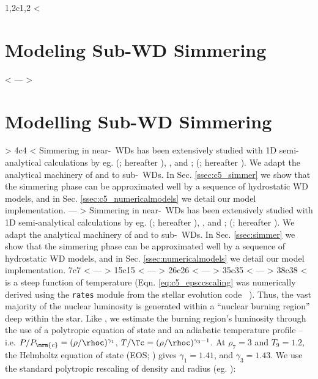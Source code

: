 1,2c1,2
< \section{Modeling Sub-\Mch WD Simmering}
< \label{sec:c5_modelsim}
---
> \section{Modelling Sub-\Mch WD Simmering}
> \label{sec:modelsim}
4c4
< Simmering in near-\Mch\ WDs has been extensively studied with 1D semi-analytical calculations by eg. \citeauthor{wooswk04} (\citeyear{wooswk04}; hereafter \citeal{wooswk04}), \cite{lesa+06, piro08}, and \citeauthor{piroc08}; (\citeyear{piroc08}; hereafter \citeal{piroc08}).  We adapt the analytical machinery of \citeal{wooswk04} and \citeal{piroc08} to sub-\Mch\ WDs.  In Sec. \ref{ssec:c5_simmer} we show that the simmering phase can be approximated well by a sequence of hydrostatic WD models, and in Sec. \ref{ssec:c5_numericalmodels} we detail our model implementation.
---
> Simmering in near-\Mch\ WDs has been extensively studied with 1D semi-analytical calculations by eg. \citeauthor{wooswk04} (\citeyear{wooswk04}; hereafter \citeal{wooswk04}), \cite{lesa+06, piro08}, and \citeauthor{piroc08}; (\citeyear{piroc08}; hereafter \citeal{piroc08}).  We adapt the analytical machinery of \citeal{wooswk04} and \citeal{piroc08} to sub-\Mch\ WDs.  In Sec. \ref{ssec:simmer} we show that the simmering phase can be approximated well by a sequence of hydrostatic WD models, and in Sec. \ref{ssec:numericalmodels} we detail our model implementation.
7c7
< \label{ssec:c5_simmer}
---
> \label{ssec:simmer}
15c15
< \label{eq:c5_taucc}
---
> \label{eq:taucc}
26c26
< \label{eq:c5_convlum}
---
> \label{eq:convlum}
35c35
< \label{eq:c5_epsccscaling}
---
> \label{eq:epsccscaling}
38c38
< \noindent is a steep function of temperature (Eqn. \ref{eq:c5_epsccscaling} was numerically derived using the \texttt{rates} module from the stellar evolution code \mesa\ \citep{paxt+11}).  Thus, the vast majority of the nuclear luminosity is generated within a ``nuclear burning region'' deep within the star.  Like \citeal{wooswk04}, we estimate the burning region's luminosity through the use of a polytropic equation of state and an adiabatic temperature profile -- i.e. $P/P_\mrm{c} = (\rho/\rhoc)^{\gamma_1}$, $T/\Tc = (\rho/\rhoc)^{\gamma_3-1}$.  At $\rho_7 = 3$ and $T_9 = 1.2$, the Helmholtz equation of state (EOS; \citealt{timms00}) gives $\gamma_1 = 1.41$, and $\gamma_3 = 1.43$.  We use the standard polytropic rescaling of density and radius (eg. \citealt{kippww12}): 
